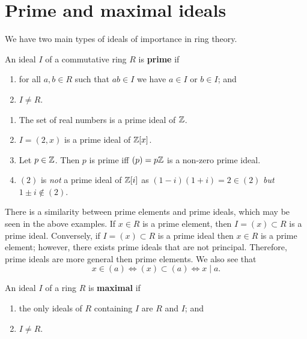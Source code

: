 \section{Prime and maximal ideals}

We have two main types of ideals of importance in ring theory.

\begin{definition}
    An ideal $I$ of a commutative ring $R$ is \textbf{prime} if
    \begin{enumerate}
        \item for all $a, b \in R$ such that $ab \in I$ we have
            $a \in I$ or $b \in I$; and
        \item $I \neq R$.
    \end{enumerate}
\end{definition}

\begin{example}
    \begin{enumerate}
        \item The set of real numbers is a prime ideal of $\mathbb{Z}$.

        \item $I = (2, x)$ is a prime ideal of $\mathbb{Z}[x]$.

        \item Let $p \in \mathbb{Z}$. 
            Then $p$ is prime iff $(p) = p\mathbb{Z}$ is a non-zero prime ideal.

        \item $(2)$ is \emph{not} a prime ideal of $\mathbb{Z}[i]$ as
            $(1 - i)(1 + i) = 2 \in (2)$
            \emph{but}
            $1 \pm i \not \in (2)$.
    \end{enumerate}
\end{example}

There is a similarity between prime elements and prime ideals, 
which may be seen in the above examples.
If $x \in R$ is a prime element,
then $I = (x) \subset R$ is a prime ideal.
Conversely, if $I = (x) \subset R$ is a prime ideal
then $x \in R$ is a prime element;
however, there exists prime ideals that are not principal.
Therefore, prime ideals are more general then prime elements.
We also see that
\[ x \in (a) \iff (x) \subset (a) \iff x \mid a. \]

\begin{definition}
    An ideal $I$ of a ring $R$ is \textbf{maximal} if
    \begin{enumerate}
        \item the only ideals of $R$ containing $I$ are $R$ and $I$; and
        \item $I \neq R$.
    \end{enumerate}
\end{definition}

